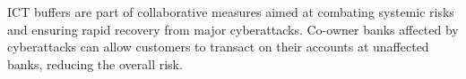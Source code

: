\begin{cikeybox}[title={Where the volume ends}]
ICT buffers are part of collaborative measures aimed at combating systemic risks and ensuring
rapid recovery from major cyberattacks. Co-owner banks affected by cyberattacks can allow
customers to transact on their accounts at unaffected banks, reducing the overall risk.
\end{cikeybox}
